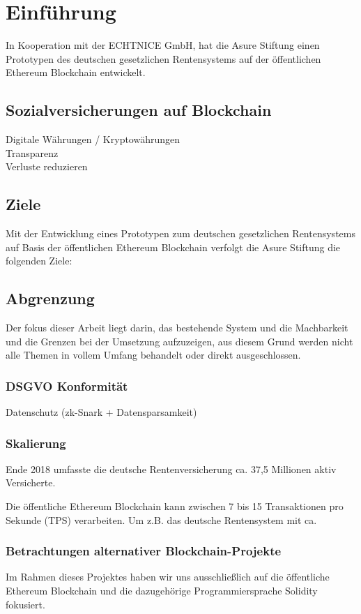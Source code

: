 \section{Einführung}
In Kooperation mit der ECHTNICE GmbH, hat die Asure Stiftung einen Prototypen des deutschen gesetzlichen Rentensystems auf der öffentlichen Ethereum Blockchain entwickelt.

\subsection{Sozialversicherungen auf Blockchain}
Digitale Währungen / Kryptowährungen\\
Transparenz\\
Verluste reduzieren\\

\subsection{Ziele}
Mit der Entwicklung eines Prototypen zum deutschen gesetzlichen Rentensystems auf Basis der öffentlichen Ethereum Blockchain verfolgt die Asure Stiftung die folgenden Ziele:

\subsection{Abgrenzung}
Der fokus dieser Arbeit liegt darin, das bestehende System und die Machbarkeit und die Grenzen bei der Umsetzung aufzuzeigen, aus diesem Grund werden nicht alle Themen in vollem Umfang behandelt oder direkt ausgeschlossen.

\subsubsection{DSGVO Konformität}
Datenschutz (zk-Snark + Datensparsamkeit)

\subsubsection{Skalierung}
Ende 2018 umfasste die deutsche Rentenversicherung ca. 37,5 Millionen aktiv Versicherte. \cite{rente2018} 

Die öffentliche Ethereum Blockchain kann zwischen 7 bis 15 Transaktionen pro Sekunde (TPS) verarbeiten. Um z.B. das deutsche Rentensystem mit ca.

\subsubsection{Betrachtungen alternativer Blockchain-Projekte}
Im Rahmen dieses Projektes haben wir uns ausschließlich auf die öffentliche Ethereum Blockchain und die dazugehörige Programmiersprache Solidity fokusiert.

